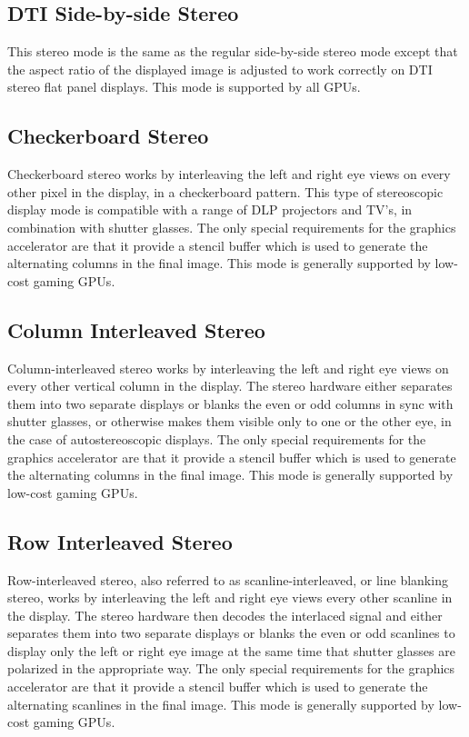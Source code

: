 \subsection{DTI Side-by-side Stereo}
This stereo mode is the same as the regular side-by-side stereo mode
except that the aspect ratio of the displayed image is adjusted to work
correctly on DTI stereo flat panel displays.
This mode is supported by all GPUs.

\subsection{Checkerboard Stereo}
Checkerboard stereo works by interleaving the left and right eye 
views on every other pixel in the display, in a checkerboard pattern.
This type of stereoscopic display mode is compatible with a range of
DLP projectors and TV's, in combination with shutter glasses.
The only special requirements for the graphics accelerator are that 
it provide a stencil buffer which is used to generate the 
alternating columns in the final image.
This mode is generally supported by low-cost gaming GPUs.

\subsection{Column Interleaved Stereo}
Column-interleaved stereo works by interleaving the left and right eye 
views on every other vertical column in the display.  
The stereo hardware either separates them into two separate displays or blanks
the even or odd columns in sync with shutter glasses, or otherwise makes
them visible only to one or the other eye, in the case of autostereoscopic
displays.
The only special requirements for the graphics accelerator are that 
it provide a stencil buffer which is used to generate the 
alternating columns in the final image.
This mode is generally supported by low-cost gaming GPUs.

\subsection{Row Interleaved Stereo}
Row-interleaved stereo, also referred to as scanline-interleaved, or
line blanking stereo,
works by interleaving the left and right eye views every other scanline
in the display.  The stereo hardware then decodes the interlaced
signal and either separates them into two separate displays or blanks
the even or odd scanlines to display only the left or right eye image
at the same time that shutter glasses are polarized in the appropriate
way.  The only special requirements for the graphics accelerator 
are that it provide a stencil buffer which is used to generate 
the alternating scanlines in the final image.
This mode is generally supported by low-cost gaming GPUs.

